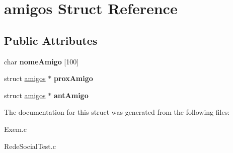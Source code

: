 \hypertarget{structamigos}{}\section{amigos Struct Reference}
\label{structamigos}
\subsection*{Public Attributes}
\begin{DoxyCompactItemize}
\item 
\mbox{\label{structamigos_a0adf1a789c55c6a5ea1efe1dc0aa35bf}} 
char {\bfseries nome\+Amigo} \mbox{[}100\mbox{]}
\item 
\mbox{\label{structamigos_a219840b7f266ef3011fcc4afe0318729}} 
struct \hyperlink{structamigos}{amigos} $\ast$ {\bfseries prox\+Amigo}
\item 
\mbox{\label{structamigos_a073b05598d44533782e020e2a6a5aaae}} 
struct \hyperlink{structamigos}{amigos} $\ast$ {\bfseries ant\+Amigo}
\end{DoxyCompactItemize}


The documentation for this struct was generated from the following files\+:\begin{DoxyCompactItemize}
\item 
Exem.\+c\item 
Rede\+Social\+Test.\+c\end{DoxyCompactItemize}
